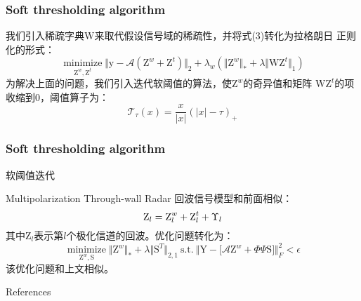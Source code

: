 \documentclass[12pt]{beamer}
\begin{document}
\begin{frame}
  \frametitle{Soft thresholding algorithm}
  我们引入稀疏字典$\text{W}$来取代假设信号域的稀疏性，并将式(3)转化为拉格朗日
  正则化的形式：
  \begin{equation}
\mathop\text{minimize}\limits_{\text{Z}^{w},\text{Z}^{t}} \Vert \text{y}-\mathcal{A}(\text{Z}^{w}+\text{Z}^{t})\Vert_{2}+\lambda_{w}(\Vert \text{Z}^{w}\Vert_{*}+\lambda\Vert \text{WZ}^{t}\Vert_{1})
  \end{equation}
  为解决上面的问题，我们引入迭代软阈值的算法，使$\text{Z}^w$的奇异值和矩阵
  $\text{WZ}^t$的项收缩到0，阈值算子为：
  \begin{equation*}
	\mathcal{T}_{\tau}(x)=\frac{x}{\vert x\vert }(\vert x\vert -\tau)_{+}
  \end{equation*}
\end{frame}
\begin{frame}
  \frametitle{Soft thresholding algorithm}
  \scriptsize
  \begin{algorithm}[H]  
	\caption{软阈值迭代}
	\label{alg:1}
	\begin{algorithmic}[1]
	  \ELSE
	  \ENDIF
	\end{algorithmic}
  \end{algorithm}
\end{frame}
\begin{frame}{Multipolarization Through-wall Radar}
  回波信号模型和前面相似：
  \begin{equation}
	\text{Z}_l=\text Z^{w}_l+\text{Z}_l^{t}+\Upsilon_l
  \end{equation}
  其中$\text{Z}_l$表示第$l$个极化信道的回波。优化问题转化为：
  \begin{equation}
	\mathop{\text{minimize}}\limits_{\text{Z}^{w},\text{S}} \Vert \text{Z}^{w}\Vert_{*}+\lambda\Vert \text{S}^T\Vert_{2,1}\ \text{s.t}.\ \Big\Vert \text{Y}-\big[\mathcal{A}\text{Z}^{w}+\Phi\Psi\text{S}\big]\Big\Vert_{F}^2 < \epsilon
  \end{equation}
  该优化问题和上文相似。
\end{frame}
\begin{frame}[allowframebreaks]{References}
  \footnotesize
   
   
\end{frame}
\end{document}
